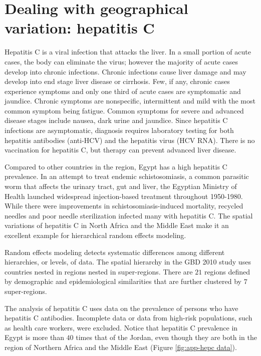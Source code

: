 \chapter{Dealing with geographical variation: hepatitis C}
\label{applications-rfx}

Hepatitis C is a viral infection that attacks the liver.  In a small
portion of acute cases, the body can eliminate the virus; however the
majority of acute cases develop into chronic infections.  Chronic
infections cause liver damage and may develop into end stage liver
disease or cirrhosis.  Few, if any, chronic cases experience symptoms
and only one third of acute cases are symptomatic and jaundice.
Chronic symptoms are nonspecific, intermittent and mild with the most
common symptom being fatigue.  Common symptoms for severe and advanced
disease stages include nausea, dark urine and jaundice.  Since
hepatitis C infections are asymptomatic, diagnosis requires laboratory
testing for both hepatitis antibodies (anti-HCV) and the hepatitis
virus (HCV RNA).  There is no vaccination for hepatitis C, but therapy
can prevent advanced liver disease. \cite{hoofnagle_hepatitis_1997,
  ghany_diagnosis_2009}

Compared to other countries in the region, Egypt has a high hepatitis
C prevalence.  In an attempt to treat endemic schistosomiasis, a
common parasitic worm that affects the urinary tract, gut and liver,
the Egyptian Ministry of Health launched widespread injection-based
treatment throughout 1950-1980.  While there were improvements in
schistosomiasis-induced mortality, recycled needles and poor needle
sterilization infected many with hepatitis C. \cite{frank_role_2000,
  mezban_hepatitis_2006, strickland_liver_2006} The spatial variations
of hepatitis C in North Africa and the Middle East make it an
excellent example for hierarchical random effects modeling.

Random effects modeling detects systematic differences among different
hierarchies, or levels, of data.  The spatial hierarchy in the GBD
2010 study uses countries nested in regions nested in super-regions.
There are $21$ regions defined by demographic and epidemiological
similarities that are further clustered by $7$ super-regions.

The analysis of hepatitis C uses data on the prevalence of persons who
have hepatitis C antibodies.  Incomplete data or data from high-risk
populations, such as health care workers, were excluded.  Notice that
hepatitis C prevalence in Egypt is more than $40$ times that of the
Jordan, even though they are both in the region of Northern Africa and
the Middle East (Figure \ref{fig:app-hepc data}).

